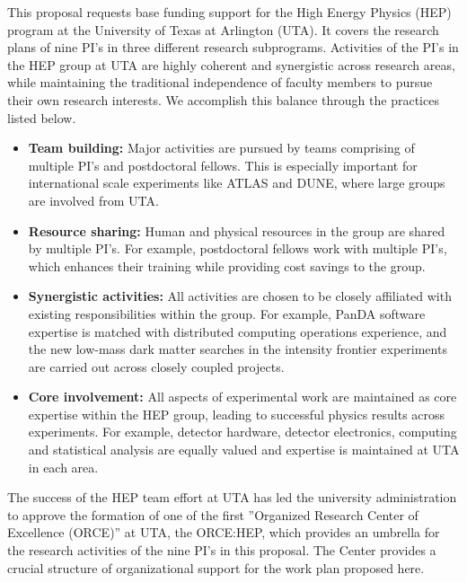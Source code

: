 %
This proposal requests base funding support for the High Energy Physics (HEP) program at the University of Texas at Arlington (UTA). It covers the research plans of nine PI's in three different research subprograms. Activities of the PI's in the HEP group at UTA are highly coherent and synergistic across research areas, while maintaining the traditional independence of faculty members to pursue their own research interests. We accomplish this balance through the practices listed below.

\begin{itemize}[noitemsep,nolistsep]

\item \textbf{Team building:} Major activities are pursued by teams comprising of multiple PI's and postdoctoral fellows. This is especially important for international scale experiments like ATLAS and DUNE, where large groups are involved from UTA.

\item \textbf{Resource sharing:} Human and physical resources in the group are shared by multiple PI's. For example, postdoctoral fellows work with multiple PI's, which enhances their training while providing cost savings to the group.

\item \textbf{Synergistic activities:} All activities are chosen to be closely affiliated with existing responsibilities within the group. For example, PanDA software expertise is matched with distributed computing operations experience, and the new low-mass dark matter searches in the intensity frontier experiments are carried out across closely coupled projects.

\item \textbf{Core involvement:} All aspects of experimental work are maintained as core expertise within the HEP group, leading to successful physics results across experiments. For example, detector hardware, detector electronics, computing and statistical analysis are equally valued and expertise is maintained at UTA in each area.

\end{itemize}

\noindent The success of the HEP team effort at UTA has led the university administration to approve the formation of one of the first ''Organized Research Center of Excellence (ORCE)'' at UTA, the ORCE:HEP, which provides an umbrella for the research activities of the nine PI's in this proposal. The Center provides a crucial structure of organizational support for the work plan proposed here.

